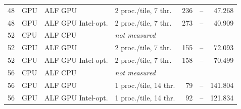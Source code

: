 {\begin{tabular}{rlllrrr}
48 & GPU & ALF GPU & 2 proc./tile, 7 thr. & 236 & -- & 47.268\\
48 & GPU & ALF GPU Intel-opt. & 2 proc./tile, 7 thr. & 273 & -- & 40.909\\
\hline
52 & CPU & ALF CPU & \multicolumn{4}{l}{\emph{not measured}}\\
52 & GPU & ALF GPU & 2 proc./tile, 7 thr. & 155 & -- & 72.093\\
52 & GPU & ALF GPU Intel-opt. & 2 proc./tile, 7 thr. & 158 & -- & 70.499\\
\hline
56 & CPU & ALF CPU & \multicolumn{4}{l}{\emph{not measured}}\\
56 & GPU & ALF GPU & 1 proc./tile, 14 thr. & 79 & -- & 141.804\\
56 & GPU & ALF GPU Intel-opt. & 1 proc./tile, 14 thr. & 92 & -- & 121.834\\
\end{tabular}}
\newcommand{\FacExtrL}{56}\newcommand{\FacExtr}{13}\newcommand{\FacExtrBase}{11}\newcommand{\CpuExp}{7}
\newcommand{\FacExtrList}{13$\times$ ($L=40$), 13$\times$ ($L=44$), 13$\times$ ($L=48$), 13$\times$ ($L=52$), 13$\times$ ($L=56$)}
